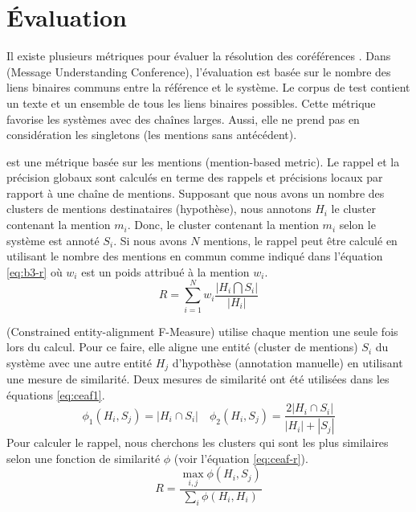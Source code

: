 \documentclass{KodeBook}
\begin{document}
\section{Évaluation}

Il existe plusieurs métriques pour évaluer la résolution des coréférences \cite{2016-moosavi-strube}.
Dans  (Message Understanding Conference), l'évaluation est basée sur le nombre des liens binaires communs entre la référence et le système.
Le corpus de test contient un texte et un ensemble de tous les liens binaires possibles. 
Cette métrique favorise les systèmes avec des chaînes larges. 
Aussi, elle ne prend pas en considération les singletons (les mentions sans antécédent).

 est une métrique basée sur les mentions (mention-based metric). 
Le rappel et la précision globaux sont calculés en terme des rappels et précisions locaux par rapport à une chaîne de mentions. 
Supposant que nous avons un nombre des clusters de mentions destinataires (hypothèse), nous annotons $H_i$ le cluster contenant la mention $m_i$. 
Donc, le cluster contenant la mention $m_i$ selon le système est annoté $S_i$. 
Si nous avons $N$ mentions, le rappel peut être calculé en utilisant le nombre des mentions en commun comme indiqué dans l'équation \ref{eq:b3-r} où $w_i$ est un poids attribué à la mention $w_i$. 
\begin{equation}\label{eq:b3-r}
R = \sum_{i=1}^{N} w_i \frac{|H_i \bigcap S_i|}{|H_i|}
\end{equation}

 (Constrained entity-alignment F-Measure) utilise chaque mention une seule fois lors du calcul. 
Pour ce faire, elle aligne une entité (cluster de mentions) $S_i$ du système avec une autre entité $H_j$ d'hypothèse (annotation manuelle) en utilisant une mesure de similarité. 
Deux mesures de similarité ont été utilisées dans les équations \ref{eq:ceaf1}.
\begin{equation}\label{eq:ceaf1}
\phi_1(H_i, S_j) = |H_i \cap S_i | \quad \phi_2(H_i, S_j) = \frac{2|H_i \cap S_i | }{|H_i| + |S_j|}
\end{equation}
Pour calculer le rappel, nous cherchons les clusters qui sont les plus similaires selon une fonction de similarité $\phi$ (voir l'équation \ref{eq:ceaf-r}).
\begin{equation}\label{eq:ceaf-r}
R = \frac{\max_{i,j} \phi(H_i, S_j)}{\sum_i \phi(H_i, H_i)}
\end{equation}
\end{document}

